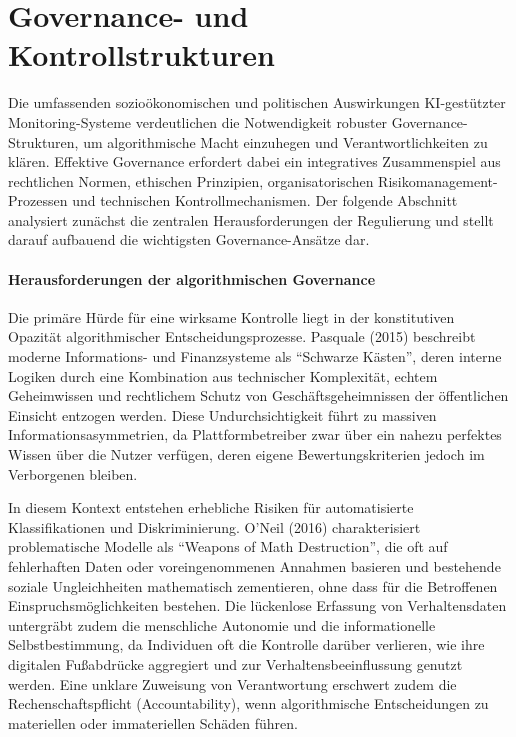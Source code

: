 \section{Governance- und Kontrollstrukturen}

Die umfassenden sozioökonomischen und politischen Auswirkungen \ac{KI}-gestützter Monitoring-Systeme verdeutlichen die Notwendigkeit robuster Governance-Strukturen, um algorithmische Macht einzuhegen und Verantwortlichkeiten zu klären. Effektive Governance erfordert dabei ein integratives Zusammenspiel aus rechtlichen Normen, ethischen Prinzipien, organisatorischen Risikomanagement-Prozessen und technischen Kontrollmechanismen. Der folgende Abschnitt analysiert zunächst die zentralen Herausforderungen der Regulierung und stellt darauf aufbauend die wichtigsten Governance-Ansätze dar.

\paragraph{Herausforderungen der algorithmischen Governance}

Die primäre Hürde für eine wirksame Kontrolle liegt in der konstitutiven Opazität algorithmischer Entscheidungsprozesse. Pasquale (2015) beschreibt moderne Informations- und Finanzsysteme als \enquote{Schwarze Kästen}, deren interne Logiken durch eine Kombination aus technischer Komplexität, echtem Geheimwissen und rechtlichem Schutz von Geschäftsgeheimnissen der öffentlichen Einsicht entzogen werden. Diese Undurchsichtigkeit führt zu massiven Informationsasymmetrien, da Plattformbetreiber zwar über ein nahezu perfektes Wissen über die Nutzer verfügen, deren eigene Bewertungskriterien jedoch im Verborgenen bleiben.

In diesem Kontext entstehen erhebliche Risiken für automatisierte Klassifikationen und Diskriminierung. O'Neil (2016) charakterisiert problematische Modelle als \enquote{Weapons of Math Destruction}, die oft auf fehlerhaften Daten oder voreingenommenen Annahmen basieren und bestehende soziale Ungleichheiten mathematisch zementieren, ohne dass für die Betroffenen Einspruchsmöglichkeiten bestehen. Die lückenlose Erfassung von Verhaltensdaten untergräbt zudem die menschliche Autonomie und die informationelle Selbstbestimmung, da Individuen oft die Kontrolle darüber verlieren, wie ihre digitalen Fußabdrücke aggregiert und zur Verhaltensbeeinflussung genutzt werden. Eine unklare Zuweisung von Verantwortung erschwert zudem die Rechenschaftspflicht (Accountability), wenn algorithmische Entscheidungen zu materiellen oder immateriellen Schäden führen.

